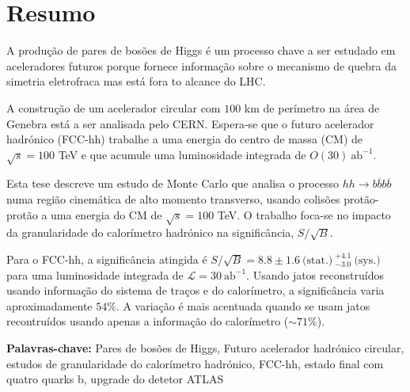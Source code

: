 
\section*{Resumo}


A produ\c {c}\~{a}o de pares de bos\~{o}es de Higgs \'{e} um processo chave a ser estudado em aceleradores futuros porque fornece informa\c{c}\~{a}o sobre o mecanismo de quebra da simetria eletrofraca mas est\'{a} fora to alcance do LHC.

A constru\c{c}\~{a}o de um acelerador circular com $100$ km de per\'{i}metro na \'{a}rea de Genebra est\'{a} a ser analisada pelo CERN. Espera-se que o futuro acelerador hadr\'{o}nico (FCC-hh) trabalhe a uma energia do centro de massa (CM) de $\sqrt{s}=100$ TeV e que acumule uma luminosidade integrada de $O(30)~\text{ab}^{-1}$.

Esta tese descreve um estudo de Monte Carlo que analisa o processo $hh\rightarrow b\overline{b}b\overline{b}$ numa regi\~{a}o cinem\'{a}tica de alto momento transverso, usando colis\~{o}es prot\~{a}o-prot\~{a}o a uma energia do CM de $\sqrt{s}=100$ TeV. O trabalho foca-se no impacto da granularidade do calor\'{i}metro hadr\'{o}nico na signific\^{a}ncia, $S/\sqrt{B}$. 

Para o FCC-hh, a signific\^{a}ncia atingida \'{e} $S/\sqrt{B}=8.8\pm 1.6~\text{(stat.)}~^{+4.1}_{-3.0}~\text{(sys.)}$ para uma luminosidade integrada de $\mathcal{L}=30~\text{ab}^{-1}$. Usando jatos reconstru\'{i}dos usando informa\c{c}\~{a}o do sistema de tra\c{c}os e do calor\'{i}metro, a signific\^{a}ncia varia aproximadamente $54\%$. A varia\c{c}\~{a}o \'{e} mais acentuada quando se usam jatos recontru\'{i}dos usando apenas a informa\c{c}\~{a}o do calor\'{i}metro ($\sim 71\%$).

\vfill

\textbf{\Large Palavras-chave:} Pares de bos\~{o}es de Higgs, Futuro acelerador hadr\'{o}nico circular, estudos de granularidade do calor\'{i}metro hadr\'{o}nico, FCC-hh, estado final com quatro quarks b, upgrade do detetor ATLAS

